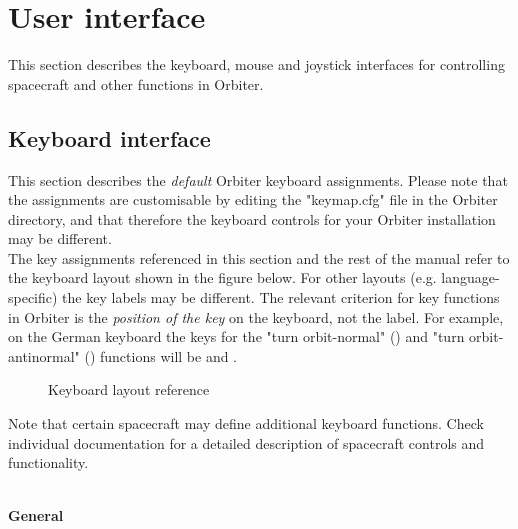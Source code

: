 \documentclass[Orbiter User Manual.tex]{subfiles}
\begin{document}
\section{User interface}
\label{sec:user_interface}
This section describes the keyboard, mouse and joystick interfaces for controlling spacecraft and other functions in Orbiter.


\subsection{Keyboard interface}
This section describes the \textit{default} Orbiter keyboard assignments. Please note that the assignments are customisable by editing the "keymap.cfg" file in the Orbiter directory, and that therefore the keyboard controls for your Orbiter installation may be different.\\
The key assignments referenced in this section and the rest of the manual refer to the keyboard layout shown in the figure below. For other layouts (e.g. language-specific) the key labels may be different. The relevant criterion for key functions in Orbiter is the \textit{position of the key} on the keyboard, not the label. For example, on the German keyboard the keys for the "turn orbit-normal" (\keystroke{;}) and "turn orbit-antinormal" () functions will be  and .

\begin{figure}[H]
	\centering
	\caption{Keyboard layout reference}
\end{figure}

\noindent
Note that certain spacecraft may define additional keyboard functions. Check individual documentation for a detailed description of spacecraft controls and functionality.\\


\leavevmode\\
\noindent
\textbf{General}
\end{document}
